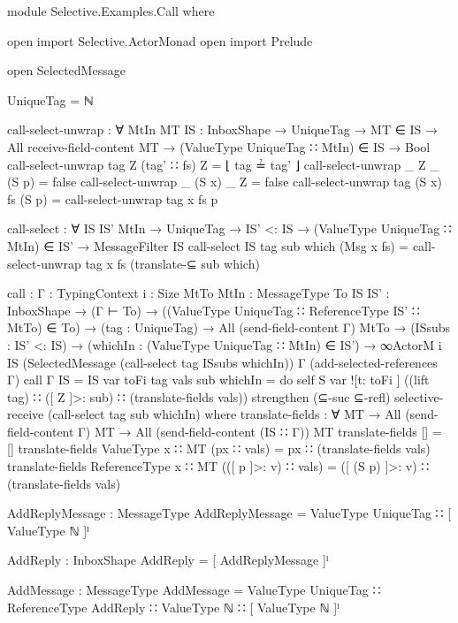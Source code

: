 \begin{code}
module Selective.Examples.Call where

open import Selective.ActorMonad
open import Prelude

open SelectedMessage

UniqueTag = ℕ

call-select-unwrap : ∀ {MtIn MT} {IS : InboxShape} →
                        UniqueTag →
                        MT ∈ IS →
                        All receive-field-content MT →
                        (ValueType UniqueTag ∷ MtIn) ∈ IS →
                        Bool
call-select-unwrap tag Z (tag' ∷ fs) Z = ⌊ tag ≟ tag' ⌋
call-select-unwrap _ Z _ (S p) = false
call-select-unwrap _ (S x) _ Z = false
call-select-unwrap tag (S x) fs (S p) = call-select-unwrap tag x fs p

call-select : ∀ {IS IS' MtIn} →
                UniqueTag →
                IS' <: IS →
                (ValueType UniqueTag ∷ MtIn) ∈ IS' →
                MessageFilter IS
call-select {IS} tag sub which (Msg x fs) =
  call-select-unwrap tag x fs (translate-⊆  sub which)

call : {Γ : TypingContext} {i : Size}
        {MtTo MtIn : MessageType}
        {To IS IS' : InboxShape} →
        (Γ ⊢ To) →
        ((ValueType UniqueTag ∷ ReferenceType IS' ∷ MtTo) ∈ To) →
        (tag : UniqueTag) →
        All (send-field-content Γ) MtTo →
        (ISsubs : IS' <: IS) →
        (whichIn : (ValueType UniqueTag ∷ MtIn) ∈ IS') →
        ∞ActorM i IS
          (SelectedMessage (call-select tag ISsubs whichIn))
          Γ (add-selected-references Γ)
call {Γ} {IS = IS} var toFi tag vals sub whichIn =
  do
      self
      S var ![t: toFi ] ((lift tag) ∷ ([ Z ]>: sub) ∷ (translate-fields vals))
      strengthen (⊆-suc ⊆-refl)
      selective-receive (call-select tag sub whichIn)
  where
    translate-fields : ∀ {MT} →
                        All (send-field-content Γ) MT →
                        All (send-field-content (IS ∷ Γ)) MT
    translate-fields [] = []
    translate-fields {ValueType x ∷ MT} (px ∷ vals) =
      px ∷ (translate-fields vals)
    translate-fields {ReferenceType x ∷ MT} (([ p ]>: v) ∷ vals) =
      ([ (S p) ]>: v) ∷ (translate-fields vals)

AddReplyMessage : MessageType
AddReplyMessage = ValueType UniqueTag ∷ [ ValueType ℕ ]ˡ

AddReply : InboxShape
AddReply = [ AddReplyMessage ]ˡ

AddMessage : MessageType
AddMessage = ValueType UniqueTag ∷ ReferenceType AddReply ∷ ValueType ℕ ∷ [ ValueType ℕ ]ˡ


\end{code}
